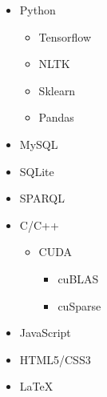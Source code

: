 \documentclass[10pt,a4paper,sans]{moderncv} %
\begin{document}
	\begin{cvcolumns}
		{
			\vspace{-2em}
			\begin{multicols}{2}
				\begin{itemize}
					\item Python
					\begin{itemize}
						\item Tensorflow
						\item NLTK
						\item Sklearn
						\item Pandas
					\end{itemize}
					\item MySQL
					\item SQLite
					\item SPARQL
					\item C/C++ 
					\begin{itemize}
						\item CUDA
						\begin{itemize}
							\item cuBLAS
							\item cuSparse
						\end{itemize}
					\end{itemize}
					\item JavaScript 
					\item HTML5/CSS3
					\item \LaTeX 
				\end{itemize}
			\end{multicols}
		}
		
		
	\end{cvcolumns}
	
	\vspace{-2em}
\end{document}
